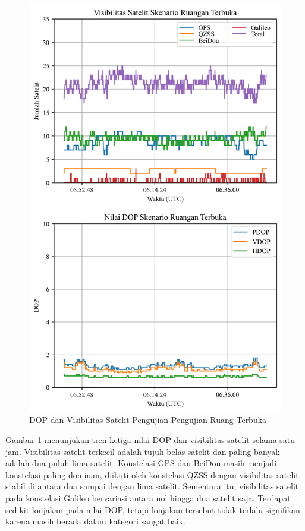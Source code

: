 \begin{figure}[H]
	\centering
	\includegraphics[width=12cm]{contents/chapter-4/4-skenario-outdoor/sats_dop.png}
	\caption{DOP dan Visibilitas Satelit Pengujian Pengujian Ruang Terbuka}
	\label{Fig: outdoor-dop_sats}
\end{figure}

Gambar \ref{Fig: outdoor-dop_sats} menunjukan tren ketiga nilai DOP dan visibilitas satelit selama satu jam. Visibilitas satelit terkecil adalah tujuh belas satelit dan paling banyak adalah dua puluh lima satelit. Konstelasi GPS dan BeiDou masih menjadi konstelasi paling dominan, diikuti oleh konstelasi QZSS dengan visibilitas satelit stabil di antara dua sampai dengan lima satelit. Sementara itu, visibilitas satelit pada konstelasi Galileo bervariasi antara nol hingga dua satelit saja. Terdapat sedikit lonjakan pada nilai DOP, tetapi lonjakan tersebut tidak terlalu signifikan karena masih berada dalam kategori sangat baik.

